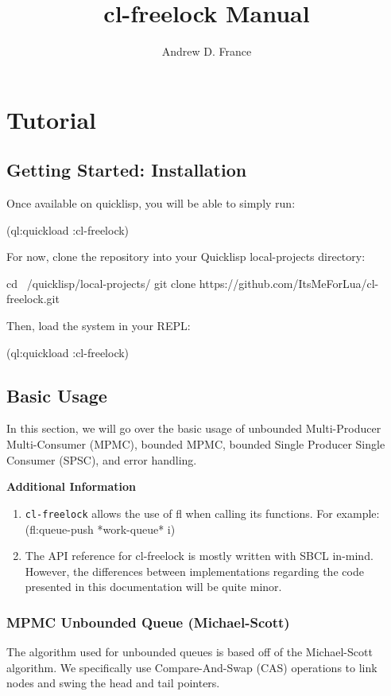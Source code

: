 \documentclass[12pt, letterpaper]{article}
\date{\lastedited}
\title{cl-freelock Manual}
\author{Andrew D. France}
\date{\lastedited}
\DeclareRobustCommand{\code}[1]{%
	\begingroup
	\setlength{\fboxsep}{2pt}%
	\colorbox{gray!15}{\ttfamily\small #1}%
	\endgroup
}
\begin{document}
	
	\maketitle
	\newpage
	
	\tableofcontents
	\newpage
	\section{Tutorial}
	\subsection{Getting Started: Installation}
	Once available on quicklisp, you will be able to simply run:
\begin{lispcode}
(ql:quickload :cl-freelock)
\end{lispcode}
	For now, clone the repository into your Quicklisp local-projects directory:
\begin{bashcode}
cd ~/quicklisp/local-projects/
git clone https://github.com/ItsMeForLua/cl-freelock.git
\end{bashcode}
	Then, load the system in your REPL:
\begin{lispcode}
(ql:quickload :cl-freelock)
\end{lispcode}

	\subsection{Basic Usage}
	In this section, we will go over the basic usage of unbounded Multi-Producer Multi-Consumer (MPMC), bounded MPMC, bounded Single Producer Single Consumer (SPSC), and error handling.
	
	\textbf{Additional Information}
	\begin{enumerate}
		\item \texttt{cl-freelock} allows the use of \code{fl} when calling its functions.
		\subitem  For example: \code{(fl:queue-push *work-queue* i)}
		\item The API reference for cl-freelock is mostly written with SBCL in-mind. However, the differences between implementations regarding the code presented in this documentation will be quite minor.
	\end{enumerate}
	
	
	
	\subsubsection{MPMC Unbounded Queue (Michael-Scott)}
	The algorithm used for unbounded queues is based off of the Michael-Scott algorithm. We specifically use Compare-And-Swap (CAS) operations to link nodes and swing the head and tail pointers.
	
\end{document}
